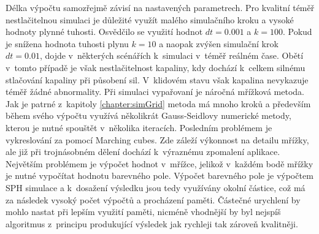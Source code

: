 Délka výpočtu samozřejmě závisí na nastavených parametrech. Pro kvalitní téměř nestlačitelnou simulaci je důležité využít malého simulačního kroku a vysoké hodnoty plynné tuhosti. Osvědčilo se využití hodnot $dt=0.001$ a $k=100$. Pokud je snížena hodnota tuhosti plynu $k=10$ a naopak zvýšen simulační krok $dt=0.01$, dojde v~některých scénářích k~simulaci v~téměř reálném čase. Obětí v~tomto případě je však nestlačitelnost kapaliny, kdy dochází k~celkem silnému stlačování kapaliny při působení sil. V~klidovém stavu však kapalina nevykazuje téměř žádné abnormality. Při simulaci vypařovaní je náročná mřížková metoda. Jak je patrné z~kapitoly \ref{chapter:simGrid} metoda má mnoho kroků a především během svého výpočtu využívá několikrát Gauss-Seidlovy numerické metody, kterou je nutné spouštět v~několika iteracích. Posledním problémem je vykreslování za pomocí Marching cubes. Zde záleží výkonnost na detailu mřížky, ale již při trojnásobném dělení dochází k~výraznému zpomalení aplikace. Největším problémem je výpočet hodnot v~mřížce, jelikož v~každém bodě mřížky je nutné vypočítat hodnotu barevného pole. Výpočet barevného pole je výpočtem SPH simulace a k~dosažení výsledku jsou tedy využívány okolní částice, což má za následek vysoký počet výpočtů a procházení paměti. Částečné urychlení by mohlo nastat při lepším využití paměti, nicméně vhodnější by byl nejspíš algoritmus z~principu produkující výsledek jak rychleji tak zároveň kvalitněji.


